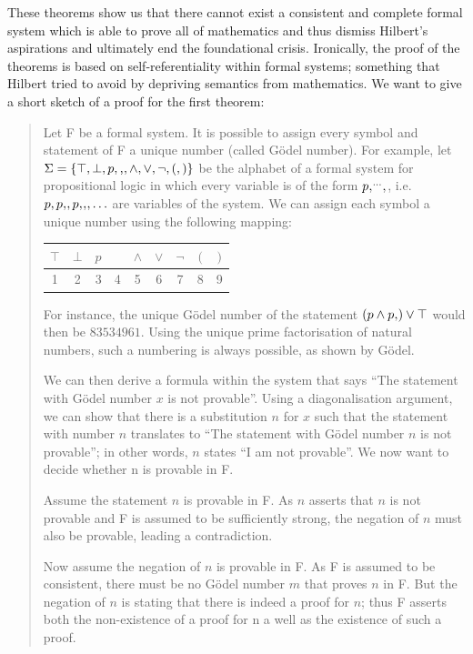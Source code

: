 \documentclass[hidelinks]{article}
\newcommand*\vtick{\textsc{\char13}}
\begin{document}
These theorems show us that there cannot exist a consistent and complete formal system which is able to prove all of mathematics and thus dismiss Hilbert's aspirations and ultimately end the foundational crisis. Ironically, the proof of the theorems is based on self-referentiality within formal systems; something that Hilbert tried to avoid by depriving semantics from mathematics.
We want to give a short sketch of a proof for the first theorem:
\begin{quote}
Let F be a formal system. It is possible to assign every symbol and statement of F a unique number (called Gödel number). For example, let $\Sigma=\{\top,\bot,p,\vtick,\land,\lor,\lnot,(,)\}$ be the alphabet of a formal system for propositional logic in which every variable is of the form $p\vtick^{\ldots}\vtick$, i.e.\ $p,p\vtick,p\vtick\vtick,\ldots$ are variables of the system. We can assign each symbol a unique number using the following mapping:

\begin{center}
\begin{tabular}{| c | c | c | c | c | c | c | c | c |}
\hline $\top$ & $\bot$ & $p$ & \vtick & $\land$ & $\lor$ & $\lnot$ & $($ & $)$ \\
\hline 1 & 2 & 3 & 4 & 5 & 6 & 7 & 8 & 9\\
\hline
\end{tabular}
\end{center}
For instance, the unique Gödel number of the statement $(p\land p\vtick)\lor \top$ would then be $83534961$. Using the unique prime factorisation of natural numbers, such a numbering is always possible, as shown by Gödel.%

We can then derive a formula within the system that says ``The statement with Gödel number $x$ is not provable''. Using a diagonalisation argument, we can show that there is a substitution $n$ for $x$ such that the statement with number $n$ translates to ``The statement with Gödel number $n$ is not provable''; in other words, $n$ states ``I am not provable''. We now want to decide whether n is provable in F.

Assume the statement $n$ is provable in F. As $n$ asserts that $n$ is not provable and F is assumed to be sufficiently strong, the negation of $n$ must also be provable, leading a contradiction.

Now assume the negation of $n$ is provable in F. As F is assumed to be consistent, there must be no Gödel number $m$ that proves $n$ in F. But the negation of $n$ is stating that there is indeed a proof for $n$; thus F asserts both the non-existence of a proof for n a well as the existence of such a proof.
\end{quote}
\end{document}
